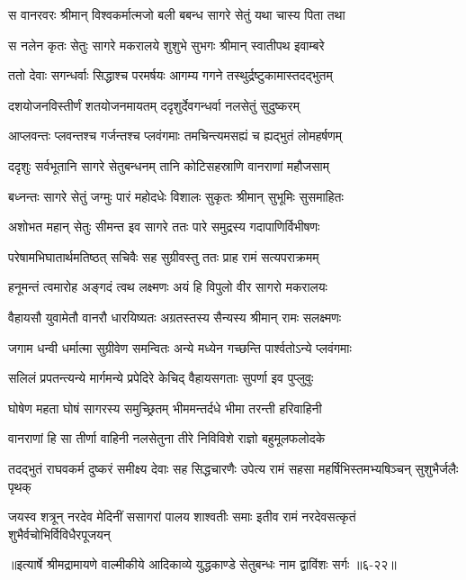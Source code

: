 \twolineshloka
{स वानरवरः श्रीमान् विश्वकर्मात्मजो बली}
{बबन्ध सागरे सेतुं यथा चास्य पिता तथा} %

\twolineshloka
{स नलेन कृतः सेतुः सागरे मकरालये}
{शुशुभे सुभगः श्रीमान् स्वातीपथ इवाम्बरे} %

\twolineshloka
{ततो देवाः सगन्धर्वाः सिद्धाश्च परमर्षयः}
{आगम्य गगने तस्थुर्द्रष्टुकामास्तदद्भुतम्} %

\twolineshloka
{दशयोजनविस्तीर्णं शतयोजनमायतम्}
{ददृशुर्देवगन्धर्वा नलसेतुं सुदुष्करम्} %

\twolineshloka
{आप्लवन्तः प्लवन्तश्च गर्जन्तश्च प्लवंगमाः}
{तमचिन्त्यमसह्यं च ह्यद्भुतं लोमहर्षणम्} %

\twolineshloka
{ददृशुः सर्वभूतानि सागरे सेतुबन्धनम्}
{तानि कोटिसहस्राणि वानराणां महौजसाम्} %

\twolineshloka
{बध्नन्तः सागरे सेतुं जग्मुः पारं महोदधेः}
{विशालः सुकृतः श्रीमान् सुभूमिः सुसमाहितः} %

\twolineshloka
{अशोभत महान् सेतुः सीमन्त इव सागरे}
{ततः पारे समुद्रस्य गदापाणिर्विभीषणः} %

\twolineshloka
{परेषामभिघातार्थमतिष्ठत् सचिवैः सह}
{सुग्रीवस्तु ततः प्राह रामं सत्यपराक्रमम्} %

\twolineshloka
{हनूमन्तं त्वमारोह अङ्गदं त्वथ लक्ष्मणः}
{अयं हि विपुलो वीर सागरो मकरालयः} %

\twolineshloka
{वैहायसौ युवामेतौ वानरौ धारयिष्यतः}
{अग्रतस्तस्य सैन्यस्य श्रीमान् रामः सलक्ष्मणः} %

\twolineshloka
{जगाम धन्वी धर्मात्मा सुग्रीवेण समन्वितः}
{अन्ये मध्येन गच्छन्ति पार्श्वतोऽन्ये प्लवंगमाः} %

\twolineshloka
{सलिलं प्रपतन्त्यन्ये मार्गमन्ये प्रपेदिरे}
{केचिद् वैहायसगताः सुपर्णा इव पुप्लुवुः} %

\twolineshloka
{घोषेण महता घोषं सागरस्य समुच्छ्रितम्}
{भीममन्तर्दधे भीमा तरन्ती हरिवाहिनी} %

\twolineshloka
{वानराणां हि सा तीर्णा वाहिनी नलसेतुना}
{तीरे निविविशे राज्ञो बहुमूलफलोदके} %

\twolineshloka
{तदद्भुतं राघवकर्म दुष्करं समीक्ष्य देवाः सह सिद्धचारणैः}
{उपेत्य रामं सहसा महर्षिभिस्तमभ्यषिञ्चन् सुशुभैर्जलैः पृथक्} %

\twolineshloka
{जयस्व शत्रून् नरदेव मेदिनीं ससागरां पालय शाश्वतीः समाः}
{इतीव रामं नरदेवसत्कृतं शुभैर्वचोभिर्विविधैरपूजयन्} %


॥इत्यार्षे श्रीमद्रामायणे वाल्मीकीये आदिकाव्ये युद्धकाण्डे सेतुबन्धः नाम द्वाविंशः सर्गः ॥६-२२॥

